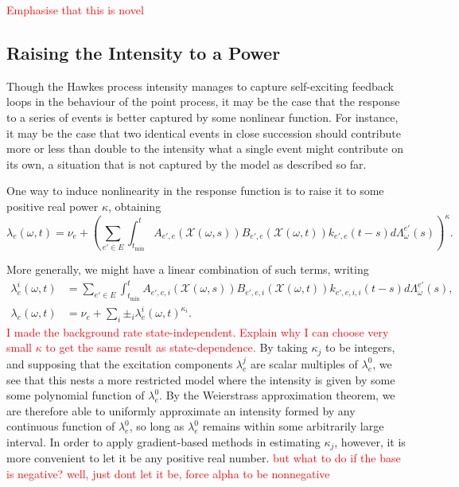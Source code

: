 \documentclass[honours,12pt]{unswthesis}
\numberwithin{equation}{section}
\begin{document}
\textcolor{red}{Emphasise that this is novel}

\subsection{Raising the Intensity to a Power}
Though the Hawkes process intensity manages to capture self-exciting feedback loops in the behaviour of the point process, it may be the case that the response to a series of events is better captured by some nonlinear function. For instance, it may be the case that two identical events in close succession should contribute more or less than double to the intensity what a single event might contribute on its own, a situation that is not captured by the model as described so far.

One way to induce nonlinearity in the response function is to raise it to some positive real power $\kappa$, obtaining
$$\lambda_e(\omega,t) = \nu_e + \left(\sum_{e'\in E}\int_{t_\mathrm{min}}^t A_{e',e}(\mathcal{X}(\omega,s))B_{e',e}(\mathcal{X}(\omega,t))k_{e',e}(t-s)d\Lambda_\omega^{e'}(s)\right)^\kappa.$$

More generally, we might have a linear combination of such terms, writing
\begin{equation}
	\begin{align}
		\lambda_e^i(\omega,t) &= \sum_{e'\in E}\int_{t_\mathrm{min}}^t A_{e',e,i}(\mathcal{X}(\omega,s))B_{e',e,i}(\mathcal{X}(\omega,t))k_{e',e,i,i}(t-s)d\Lambda_\omega^{e'}(s), \\
		\lambda_e(\omega,t) &= \nu_e + \sum_i \pm_i \lambda_e^i(\omega,t)^{\kappa_i}.
	\end{align}\label{eq:general_model}
\end{equation}
\textcolor{red}{I made the background rate state-independent. Explain why I can choose very small $\kappa$ to get the same result as state-dependence.}
By taking $\kappa_j$ to be integers, and supposing that the excitation components $\lambda_e^j$ are scalar multiples of $\lambda_e^0$, we see that this nests a more restricted model where the intensity is given by some some polynomial function of $\lambda_e^0$. By the Weierstrass approximation theorem, we are therefore able to uniformly approximate an intensity formed by any continuous function of $\lambda_e^0$, so long as $\lambda_e^0$ remains within some arbitrarily large interval. In order to apply gradient-based methods in estimating $\kappa_j$, however, it is more convenient to let it be any positive real number. \textcolor{red}{but what to do if the base is negative? well, just dont let it be, force alpha to be nonnegative}
\end{document}
